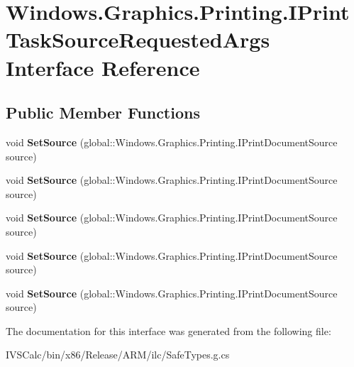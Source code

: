 \hypertarget{interface_windows_1_1_graphics_1_1_printing_1_1_i_print_task_source_requested_args}{}\section{Windows.\+Graphics.\+Printing.\+I\+Print\+Task\+Source\+Requested\+Args Interface Reference}
\label{interface_windows_1_1_graphics_1_1_printing_1_1_i_print_task_source_requested_args}
\subsection*{Public Member Functions}
\begin{DoxyCompactItemize}
\item 
\mbox{\label{interface_windows_1_1_graphics_1_1_printing_1_1_i_print_task_source_requested_args_a1d2d072284a6ffd09c2b5f0dcc5df026}} 
void {\bfseries Set\+Source} (global\+::\+Windows.\+Graphics.\+Printing.\+I\+Print\+Document\+Source source)
\item 
\mbox{\label{interface_windows_1_1_graphics_1_1_printing_1_1_i_print_task_source_requested_args_a1d2d072284a6ffd09c2b5f0dcc5df026}} 
void {\bfseries Set\+Source} (global\+::\+Windows.\+Graphics.\+Printing.\+I\+Print\+Document\+Source source)
\item 
\mbox{\label{interface_windows_1_1_graphics_1_1_printing_1_1_i_print_task_source_requested_args_a1d2d072284a6ffd09c2b5f0dcc5df026}} 
void {\bfseries Set\+Source} (global\+::\+Windows.\+Graphics.\+Printing.\+I\+Print\+Document\+Source source)
\item 
\mbox{\label{interface_windows_1_1_graphics_1_1_printing_1_1_i_print_task_source_requested_args_a1d2d072284a6ffd09c2b5f0dcc5df026}} 
void {\bfseries Set\+Source} (global\+::\+Windows.\+Graphics.\+Printing.\+I\+Print\+Document\+Source source)
\item 
\mbox{\label{interface_windows_1_1_graphics_1_1_printing_1_1_i_print_task_source_requested_args_a1d2d072284a6ffd09c2b5f0dcc5df026}} 
void {\bfseries Set\+Source} (global\+::\+Windows.\+Graphics.\+Printing.\+I\+Print\+Document\+Source source)
\end{DoxyCompactItemize}


The documentation for this interface was generated from the following file\+:\begin{DoxyCompactItemize}
\item 
I\+V\+S\+Calc/bin/x86/\+Release/\+A\+R\+M/ilc/Safe\+Types.\+g.\+cs\end{DoxyCompactItemize}
